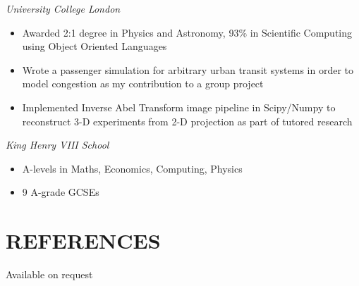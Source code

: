 \documentclass[margin, 10pt]{res}
\begin{document}
\begin{resume}
{\sl University College London} \\
\begin{itemize} \itemsep -1pt
\item Awarded 2:1 degree in Physics and Astronomy, 93\% in Scientific Computing using Object Oriented Languages
\item Wrote a passenger simulation for arbitrary urban transit systems in order to model congestion as my contribution to a group project
\item Implemented Inverse Abel Transform image pipeline in Scipy/Numpy to reconstruct 3-D experiments from 2-D projection as part of tutored research
\end{itemize}

{\sl King Henry VIII School} \\
\begin{itemize}
\item A-levels in Maths, Economics, Computing, Physics
\item 9 A-grade GCSEs
\end{itemize}

\section{REFERENCES}
Available on request

\end{resume}
\end{document}
